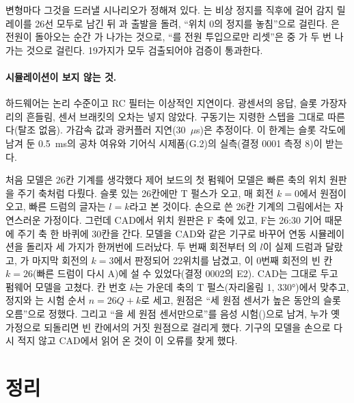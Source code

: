 변형마다 그것을 드러낼 시나리오가 정해져 있다. 는 비상 정지를  직후에 걸어 감지 릴레이를 26선 모두로
남긴 뒤 과 출발을 돌려, ``위치 0의 정지를 놓침''으로 걸린다. 은 전원이 돌아오는 순간
가 나가는 것으로, ``를 전원 투입으로만 리셋''은  중 가 두 번 나가는 것으로 걸린다.
19가지가 모두 검출되어야 검증이 통과한다.

\paragraph{시뮬레이션이 보지 않는 것.} 하드웨어는 논리 수준이고 RC 필터는 이상적인 지연이다. 광센서의 응답, 슬롯 가장자리의
흔들림, 센서 브래킷의 오차는 넣지 않았다. 구동기는 지령한 스텝을 그대로 따른다(탈조 없음). 가감속 값과 광커플러 지연(30~$\mu$s)은
추정이다. 이 한계는 슬롯 각도에 남겨 둔 0.5~ms의 공차 여유와 기어식 시제품(G.2)의 실측(결정 0001 측정 8)이 받는다.

\begin{lesson}{처음 모델은 26칸 기계를 생각했다}
제어 보드의 첫 펌웨어 모델은 빠른 축의 위치 원판을 주기 축처럼 다뤘다. 슬롯 있는 26칸에만 T 펄스가 오고, 매 회전 $k = 0$에서
원점이 오고, 빠른 드럼의 글자는 $l = k$라고 본 것이다. 손으로 쓴 26칸 기계의 그림에서는 자연스러운 가정이다. 그런데
CAD에서 위치 원판은 F 축에 있고, F는 26:30 기어 때문에 주기 축 한 바퀴에 30칸을 간다. 모델을 CAD와 같은 기구로 바꾸어
연동 시뮬레이션을 돌리자 세 가지가 한꺼번에 드러났다. 두 번째 회전부터 의 $l$이 실제 드럼과 달랐고, 가
마지막 회전의 $k = 3$에서 판정되어 22위치를 남겼고, 이 0번째 회전의 빈 칸 $k = 26$(빠른 드럼이 다시 A)에 설 수
있었다(결정 0002의 E2). CAD는 그대로 두고 펌웨어 모델을 고쳤다. 칸 번호 $k$는 가운데 축의 T 펄스(자리올림 1, 330°)에서
맞추고, 정지와 는 시험 순서 $n = 26Q + k$로 세고, 원점은 ``세 원점 센서가 높은 동안의  슬롯 오름''으로
정했다. 그리고 ``을 세 원점 센서만으로''를 음성 시험()으로 남겨, 누가 옛 가정으로 되돌리면
빈 칸에서의 거짓 원점으로 걸리게 했다. 기구의 모델을 손으로 다시 적지 않고 CAD에서 읽어 온 것이 이 오류를 찾게 했다.
\end{lesson}

\section{정리}

